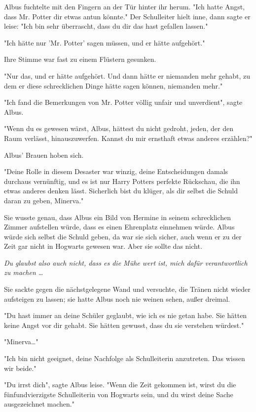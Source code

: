 {Albus fuchtelte mit den Fingern an der Tür hinter ihr herum. "Ich hatte Angst, dass Mr. Potter dir etwas antun könnte." Der Schulleiter hielt inne, dann sagte er leise: "Ich bin sehr überrascht, dass du dir das hast gefallen lassen."

"Ich hätte nur 'Mr. Potter' sagen müssen, und er hätte aufgehört."

Ihre Stimme war fast zu einem Flüstern gesunken.

"Nur das, und er hätte aufgehört. Und dann hätte er niemanden mehr gehabt, zu dem er diese schrecklichen Dinge hätte sagen können, niemanden mehr."

"Ich fand die Bemerkungen von Mr. Potter völlig unfair und unverdient", sagte Albus.

"Wenn du es gewesen wärst, Albus, hättest du nicht gedroht, jeden, der den Raum verlässt, hinauszuwerfen. Kannst du mir ernsthaft etwas anderes erzählen?"

Albus' Brauen hoben sich.

"Deine Rolle in diesem Desaster war winzig, deine Entscheidungen damals durchaus vernünftig, und es ist nur Harry Potters perfekte Rückschau, die ihn etwas anderes denken lässt. Sicherlich bist du klüger, als dir selbst die Schuld daran zu geben, Minerva."

Sie wusste genau, dass Albus ein Bild von Hermine in seinem schrecklichen Zimmer aufstellen würde, dass es einen Ehrenplatz einnehmen würde. Albus würde sich selbst die Schuld geben, da war sie sich sicher, auch wenn er zu der Zeit gar nicht in Hogwarts gewesen war. Aber sie sollte das nicht.

\emph{Du glaubst also auch nicht, dass es die Mühe wert ist, mich dafür verantwortlich zu machen …}

Sie sackte gegen die nächstgelegene Wand und versuchte, die Tränen nicht wieder aufsteigen zu lassen; sie hatte Albus noch nie weinen sehen, außer dreimal.

"Du hast immer an deine Schüler geglaubt, wie ich es nie getan habe. Sie hätten keine Angst vor dir gehabt. Sie hätten gewusst, dass du sie verstehen würdest."

"Minerva…"

"Ich bin nicht geeignet, deine Nachfolge als Schulleiterin anzutreten. Das wissen wir beide."

"Du irrst dich", sagte Albus leise. "Wenn die Zeit gekommen ist, wirst du die fünfundvierzigste Schulleiterin von Hogwarts sein, und du wirst deine Sache ausgezeichnet machen."

}
